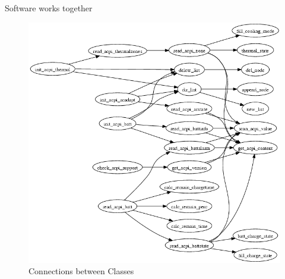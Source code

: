 \documentclass{beamer}
\begin{document}
\begin{frame}{Software works together}
    \begin{figure}
        \includegraphics[height=.7\paperheight]{figure/graph.png}
        \caption{Connections between Classes}
        \label{fig:classConnection}
    \end{figure}
\end{frame}



%
% 
\end{document}
